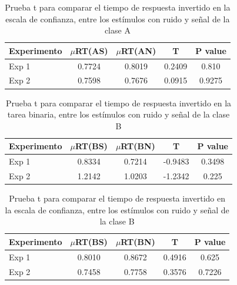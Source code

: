 \begin{table}[h]
\caption[Prueba t para comparar el tiempo de respuesta invertido en la escala de confianza, entre los estímulos con ruido y señal de la clase A]{Prueba t para comparar el tiempo de respuesta invertido en la escala de confianza, entre los estímulos con ruido y señal de la clase A}
\label{Cuadro_RT2_A}
\centering
\begin{tabular}{l | c c c c}
\toprule
\textbf{Experimento} & \textbf{$\mu$RT(AS)} & \textbf{$\mu$RT(AN)} & \textbf{T} & \textbf{P value}\\
\midrule
Exp 1 & 0.7724 & 0.8019 & 0.2409 & 0.810 \\
Exp 2 & 0.7598 & 0.7676 & 0.0915 & 0.9275  \\
\bottomrule
\end{tabular}
\end{table}


\begin{table}[h]
\caption[Prueba t para comparar el tiempo de respuesta invertido en la tarea binaria, entre los estímulos con ruido y señal de la clase B]{Prueba t para comparar el tiempo de respuesta invertido en la tarea binaria, entre los estímulos con ruido y señal de la clase B}
\label{Cuadro_RT1_B}
\centering
\begin{tabular}{l |  c c c c}
\toprule
\textbf{Experimento} & \textbf{$\mu$RT(BS)} & \textbf{$\mu$RT(BN)} & \textbf{T} & \textbf{P value}\\
\midrule
Exp 1 & 0.8334 & 0.7214 & -0.9483 & 0.3498 \\
Exp 2 & 1.2142 & 1.0203 & -1.2342 & 0.225  \\
\bottomrule
\end{tabular}
\end{table}

\begin{table}[th]
\caption[Prueba t para comparar el tiempo de respuesta invertido en la escala de confianza, entre los estímulos con ruido y señal de la clase B]{Prueba t para comparar el tiempo de respuesta invertido en la escala de confianza, entre los estímulos con ruido y señal de la clase B}
\label{Cuadro_RT2_B}
\centering
\begin{tabular}{l |  c c c c}
\toprule
\textbf{Experimento} & \textbf{$\mu$RT(BS)} & \textbf{$\mu$RT(BN)} & \textbf{T} & \textbf{P value}\\
\midrule
Exp 1 & 0.8010 & 0.8672 & 0.4916 & 0.625 \\
Exp 2 & 0.7458 & 0.7758 & 0.3576 & 0.7226  \\
\bottomrule
\end{tabular}
\end{table}
